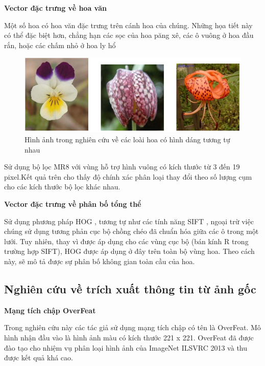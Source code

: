 \documentclass[12pt]{report}
\begin{document}
		\textbf{Vector đặc trưng về hoa văn}
		
		Một số hoa có hoa văn đặc trưng trên cánh hoa của chúng. Những họa tiết này có thể đặc biệt hơn, chẳng hạn các sọc của hoa păng xê, các ô vuông ở hoa đầu rắn, hoặc các chấm nhỏ ở hoa ly hổ
		\begin{figure}[h]
			\centering
			\includegraphics[scale=0.5]{anh_hoa_cau_truc}
			\caption{Hình ảnh trong nghiên cứu \cite{cia-Nilsback06} về các loài hoa có hình dáng tương tự nhau}
			\label{fig:anh_hoa_khacnhau_hoavan}
		\end{figure}
																												
		Sử dụng bộ lọc MR8 \cite{cia_MR8} với vùng hỗ trợ hình vuông có kích thước từ 3 đến 19 pixel.Kết quả trên cho thấy độ chính xác phân loại thay đổi theo số lượng cụm cho các kích thước bộ lọc khác nhau.
																												
		\textbf{Vector đặc trưng về phân bố tổng thể}
																												
		Sử dụng phương pháp HOG \cite{cia_HOG} , tương tự như các tính năng SIFT \cite{cia_SIFT}, ngoại trừ việc chúng sử dụng tương phản cục bộ chồng chéo đã chuẩn hóa giữa các ô trong một lưới. Tuy nhiên, thay vì được áp dụng cho các vùng cục bộ (bán kính R trong trường hợp SIFT\cite{cia_SIFT}), HOG được áp dụng ở đây trên toàn bộ vùng hoa. Theo cách này, sẽ mô tả được sự phân bố không gian toàn cầu của hoa.
																												
		\subsection{Nghiên cứu về trích xuất thông tin từ ảnh gốc}
																												
		\textbf{Mạng tích chập OverFeat \cite{cia-CNNFeatures off-the-shelf}}
		
		Trong nghiên cứu này \cite{cia-CNNFeatures off-the-shelf} các tác giả sử dụng mạng tích chập có tên là OverFeat. 
		Mô hình nhận đầu vào là hình ảnh màu có kích thước 221 x 221. OverFeat đã được đào tạo cho nhiệm vụ phân loại hình ảnh của ImageNet ILSVRC 2013 và thu được kết quả khá cao.
																										
\end{document}
